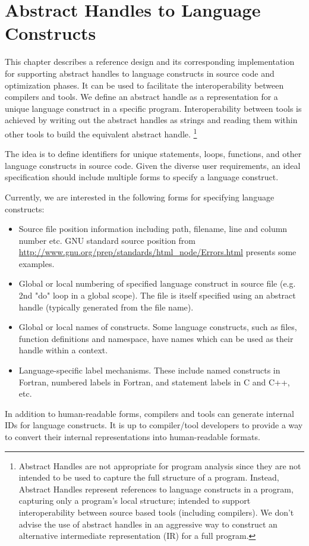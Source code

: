 \chapter{Abstract Handles to Language Constructs}
This chapter describes a reference design and its corresponding implementation for
supporting abstract handles to language constructs in source code and optimization
phases. It can be used to facilitate the interoperability between compilers and tools.
We define an abstract handle as a representation for a unique language construct in a
specific program.  Interoperability between tools is achieved by writing out the abstract handles as
strings and reading them within other tools to build the equivalent abstract handle.
\footnote{Abstract Handles are not appropriate for program analysis
since they are not intended to be used to capture the full structure of a program. Instead, 
Abstract Handles represent references to language constructs in a program, capturing only
a program's local structure; intended to support interoperability between source based
tools (including compilers).  We don't advise the use of abstract handles in an
aggressive way to construct an alternative intermediate representation (IR) for a full
program.}

The idea is to define identifiers for unique statements, loops, functions, 
and other language constructs in source code. Given the diverse user requirements, an
ideal specification should include multiple forms to specify a language construct.

Currently, we are interested in the following forms for specifying language constructs:
\begin{itemize}
   \item Source file position information including path, filename, line and column number etc. 
      GNU standard source position from 
      \url{http://www.gnu.org/prep/standards/html\_node/Errors.html} presents
      some examples.  
   \item Global or local numbering of specified language construct in source file
      (e.g. 2nd "do" loop in a global scope).  The file is itself specified using an
       abstract handle (typically generated from the file name). 
   \item Global or local names of constructs. Some language constructs, such
      as files, function definitions and namespace, have names which can be
      used as their handle within a context.
   \item Language-specific label mechanisms. These include named constructs in Fortran,
      numbered labels in Fortran, and statement labels in C and C++, etc. 
\end{itemize}
In addition to human-readable forms, compilers and tools can generate
internal IDs for language constructs. It is up to compiler/tool developers
to provide a way to convert their internal representations into human-readable formats. 


